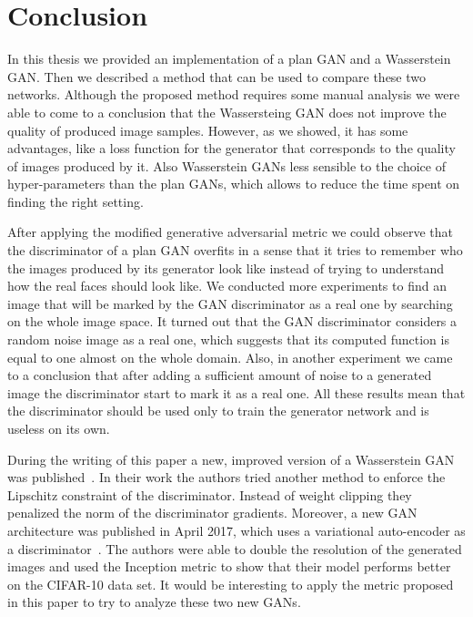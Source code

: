 \section{Conclusion}
In this thesis we provided an implementation of a plan GAN and a Wasserstein GAN. Then we described  a method that can be used to compare these two networks. Although the proposed method requires some manual analysis we were able to come to a conclusion that the Wassersteing GAN does not improve the quality of produced image samples. However, as we showed, it has some advantages, like a loss function for the generator that corresponds to the quality of images produced by it. Also Wasserstein GANs less sensible to the choice of hyper-parameters than the plan GANs, which allows to reduce the time spent on finding the right setting. 

After applying the modified generative adversarial metric we could observe that the discriminator of a plan GAN overfits in a sense that it tries to remember who the images produced by its generator look like instead of trying to understand how the real faces should look like. We conducted more experiments to find an image that will be marked by the GAN discriminator as a real one by searching on the whole image space. It turned out that the GAN discriminator considers a random noise image as a real one, which suggests that its computed function is equal to one almost on the whole domain. Also, in another experiment we came to a conclusion that after adding a sufficient amount of noise to a generated image the discriminator start to mark it as a real one. All these results mean that the discriminator should be used only to train the generator network and is useless on its own.
 
During the writing of this paper a new, improved version of a Wasserstein GAN was published~\cite{improved_wgan}. In their work the authors tried another method to enforce the Lipschitz constraint of the discriminator. Instead of weight clipping they penalized the norm of the discriminator gradients. Moreover, a new GAN architecture was published in April 2017, which uses a variational auto-encoder as a discriminator~\citep{alexnet}. The authors were able to double the resolution of the generated images and used the Inception metric to show that their model performs better on the CIFAR-10 data set. It would be interesting to apply the metric proposed in this paper to try to analyze these two new GANs. 